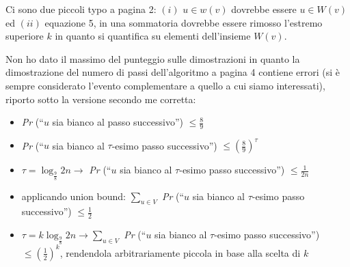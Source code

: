 \documentclass[11pt]{article}
\begin{document}
\theform
\begin{formalreport}
  Ci sono due piccoli typo a pagina 2: $(i)$ $u\in w(v)$ dovrebbe
  essere $u\in W(v)$ ed $(ii)$ equazione 5, in una sommatoria dovrebbe
  essere rimosso l'estremo superiore $k$ in quanto si quantifica su
  elementi dell'insieme $W (v)$.

  Non ho dato il massimo del punteggio sulle dimostrazioni in quanto
  la dimostrazione del numero di passi dell'algoritmo a pagina 4
  contiene errori (si \`e sempre considerato l'evento
  complementare a quello a cui siamo interessati), riporto sotto la
  versione secondo me corretta:
  \begin{itemize}
  \item \emph{Pr} (``$u$ sia bianco al passo successivo'') $\leq
    \frac{8}{9}$
  \item \emph{Pr} (``$u$ sia bianco al $\tau$-esimo passo
    successivo'') $\leq \left(\frac{8}{9}\right)^{\tau}$
  \item $\tau = \log_{\frac{9}{8}} 2n \rightarrow $ \emph{Pr} (``$u$
    sia bianco al $\tau$-esimo passo successivo'') $\leq
    \frac{1}{2n}$
  \item applicando union bound: $\sum_{u\in V}$ \emph{Pr} (``$u$ sia
    bianco al $\tau$-esimo passo successivo'') $\leq \frac{1}{2}$
  \item $\tau =k \log_{\frac{9}{8}} 2n \rightarrow \sum_{u\in V}$
    \emph{Pr} (``$u$ sia bianco al $\tau$-esimo passo successivo'')
    $\leq \left(\frac{1}{2}\right)^k$, rendendola arbitrariamente
    piccola in base alla scelta di $k$

  \end{itemize}
\end{formalreport}
\end{document}
